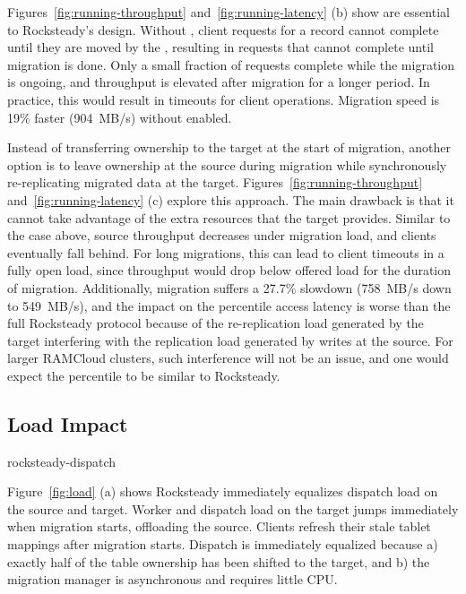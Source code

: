 Figures~\ref{fig:running-throughput} and~\ref{fig:running-latency} (b) show
\priopulls are essential to Rocksteady's design. Without \priopulls, client
requests for a record cannot complete until they are moved by the
\pulls, resulting in requests that cannot complete
until migration is done. Only a small fraction of requests complete
while the migration is ongoing, and throughput is elevated after
migration for a longer period. In practice, this would result in
timeouts for client operations. Migration speed is 19\% faster
(904~MB/s) without \priopulls enabled.

Instead of transferring ownership to the target at the start of migration,
another option is to leave ownership at the source during migration
while synchronously re-replicating migrated data at the target.
Figures~\ref{fig:running-throughput} and~\ref{fig:running-latency} (c) explore
this approach. The main drawback is that it cannot take advantage of the
extra resources that the target provides. Similar to the
case above, source throughput decreases under migration load, and clients
eventually fall behind.  For long migrations, this can lead to client timeouts
in a fully open load, since throughput would drop below offered load for the duration of migration.
Additionally, migration suffers a 27.7\% slowdown
(758~MB/s down to 549~MB/s), and the impact on the \nnnth
percentile access latency is worse than the full Rocksteady protocol
because of the re-replication load generated by the target interfering
with the replication load generated by writes at the source. For larger
RAMCloud clusters, such interference will not be an issue, and one would
expect the \nnnth percentile to be similar to Rocksteady.

\subsection{Load Impact}
\label{sec:eval-load}

 {rocksteady-dispatch}

Figure~\ref{fig:load} (a) shows Rocksteady immediately equalizes
dispatch load on the source and target. Worker and dispatch load on the
target jumps immediately when migration starts, offloading the source.
Clients refresh their stale tablet mappings after migration starts.
Dispatch is immediately equalized because
a) exactly half of the table ownership has been shifted to the target, and
b) the migration manager is asynchronous and requires little CPU.

